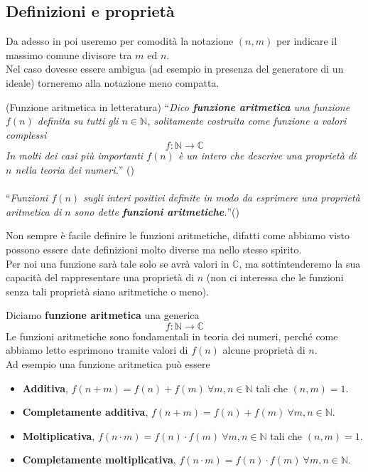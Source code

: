 \subsection{Definizioni e proprietà}
Da adesso in poi useremo per comodità la notazione $(n,m)$ per indicare il massimo comune divisore tra $m$ ed $n$.\\ Nel caso dovesse essere ambigua (ad esempio in presenza del generatore di un ideale) torneremo alla notazione meno compatta.
\begin{definizione}(Funzione aritmetica in letteratura) 
	\enquote{\textit{Dico \textbf{funzione aritmetica} una funzione $f(n)$ definita su tutti gli $n \in \mathbb{N}$, solitamente costruita come funzione a valori complessi}
	\begin{equation*}
	f:\mathbb{N}\longrightarrow\mathbb{C}
	\end{equation*}
	\textit{In molti dei casi più importanti $f(n)$ è un intero che descrive una proprietà di $n$ nella teoria dei numeri.}} (\cite[capitolo 8, pagina 143]{J12}) \\ \\
	\enquote{\textit{Funzioni $f(n)$ sugli interi positivi definite in modo da esprimere una proprietà aritmetica di $n$ sono dette \textbf{funzioni aritmetiche}.}}(\cite[capitolo 16, pagina 133; quarta edizione]{H08})%
\end{definizione}
Non sempre è facile definire le funzioni aritmetiche, difatti come abbiamo visto possono essere date definizioni molto diverse ma nello stesso spirito. \\ Per noi una funzione sarà tale solo se avrà valori in $\mathbb{C}$, ma sottintenderemo la sua capacità del rappresentare una proprietà di $n$ (non ci interessa che le funzioni senza tali proprietà siano aritmetiche o meno). 
\begin{definizione}
	Diciamo \textbf{funzione aritmetica} una generica
	\begin{equation*}
	f:\mathbb{N}\longrightarrow\mathbb{C}
	\end{equation*}
	Le funzioni aritmetiche sono fondamentali in teoria dei numeri, perché come abbiamo letto esprimono tramite valori di $f(n)$ alcune proprietà di $n$. \\ Ad esempio una funzione aritmetica può essere
	\begin{itemize}
		\item \textbf{Additiva}, $f(n+m)=f(n)+f(m) \ \forall m,n \in \mathbb{N}$ tali che $(n,m)=1$.
		\item \textbf{Completamente additiva}, $f(n+m)=f(n)+f(m) \ \forall m,n \in \mathbb{N}$.
		\item \textbf{Moltiplicativa}, $f(n\cdot m)=f(n)\cdot f(m) \ \forall m,n \in \mathbb{N}$ tali che $(n,m)=1$.
		\item \textbf{Completamente moltiplicativa}, $f(n\cdot m)=f(n)\cdot f(m) \ \forall m,n \in \mathbb{N}$.
	\end{itemize}
\end{definizione}
